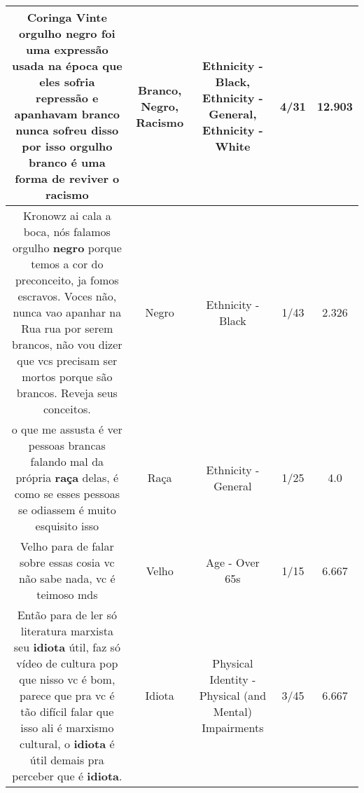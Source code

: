 \documentclass[11pt]{article}
\newlength\mylength
\begin{document}
\begin{center}
\begin{longtable}{|C{.65\mylength}|C{.30\mylength}|C{.12\mylength}|C{.12\mylength}|C{.12\mylength}|}
  \small Coringa Vinte orgulho \textbf{negro} foi uma expressão usada na época que eles sofria repressão e apanhavam \textbf{branco} nunca sofreu disso por isso orgulho \textbf{branco} é uma forma de reviver o racismo\normalsize   & Branco, Negro, Racismo & Ethnicity - Black, Ethnicity - General, Ethnicity - White & 4/31 & 12.903 \\  \hline
  \small Kronowz ai cala a boca, nós  falamos orgulho \textbf{negro} porque temos a cor do preconceito, ja fomos escravos. Voces não, nunca vao apanhar na Rua rua por serem brancos, não vou dizer que vcs precisam ser mortos porque são brancos. Reveja seus conceitos.\normalsize   & Negro & Ethnicity - Black & 1/43 & 2.326 \\  \hline
  \small o que me assusta é ver pessoas brancas falando mal da própria \textbf{raça} delas, é como se esses pessoas se odiassem é muito esquisito isso\normalsize   & Raça & Ethnicity - General & 1/25 & 4.0 \\  \hline
  \small Velho para de falar sobre essas cosia vc não sabe nada, vc é teimoso mds\normalsize   & Velho & Age - Over 65s & 1/15 & 6.667 \\  \hline
  \small Então para de ler só literatura marxista seu \textbf{idiota} útil, faz só vídeo de cultura pop que nisso vc é bom, parece que pra vc é tão difícil falar que isso ali é marxismo cultural, o \textbf{idiota} é útil demais pra perceber que é \textbf{idiota}.\normalsize   & Idiota & Physical Identity - Physical (and Mental) Impairments & 3/45 & 6.667 \\  \hline

\end{longtable}
\end{center}
\end{document}
